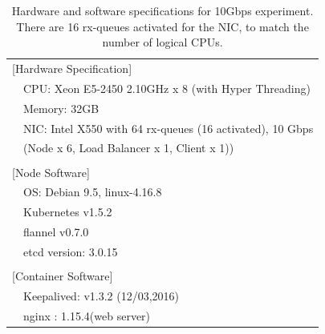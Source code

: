 {
\setlength{\tabcolsep}{1em}
\renewcommand{\arraystretch}{1.2}

\begin{table}[h]
  \centering
  \begin{tabular}{ll}
    \hline 
    \multicolumn{2}{l}{[Hardware Specification]}   \\
    & CPU: Xeon E5-2450 2.10GHz x 8 (with Hyper Threading) \\
    & Memory: 32GB \\
    & NIC: Intel X550 with 64 rx-queues (16 activated), 10 Gbps \\
    & (Node x 6, Load Balancer x 1, Client x 1)) \\
    & \\
    \multicolumn{2}{l}{[Node Software]}  \\
    & OS: Debian 9.5, linux-4.16.8 \\
    & Kubernetes v1.5.2 \\
    & flannel v0.7.0 \\
    & etcd version: 3.0.15 \\
    & \\
    \multicolumn{2}{l}{[Container Software]}   \\
    & Keepalived: v1.3.2 (12/03,2016) \\
    & nginx : 1.15.4(web server) \\
  \hline 
  \end{tabular}
  \par\bigskip
  \centering
  \begin{minipage}{0.9\columnwidth}
    \caption[Hardware and software specifications for 10Gbps experiment]{
      Hardware and software specifications for 10Gbps experiment.
      There are 16 rx-queues activated for the NIC, to match the number of logical CPUs.
    }
    \label{tab:hw_sw_spec_10g}
  \end{minipage}
\end{table}
}

